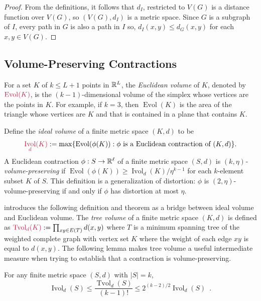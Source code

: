 \documentclass{patmorin}
\makeatletter
\renewcommand{\ge}{\geqslant}
\renewcommand{\le}{\leqslant}
\newcommand{\defin}[1]{\emph{\textcolor{brightmaroon}{#1}}}
\def\mathcolor#1#{\@mathcolor{#1}}
\def\@mathcolor#1#2#3{%
  \protect\leavevmode
  \begingroup
    \color#1{#2}#3%
  \endgroup
}
\newcommand{\mathdefin}[1]{\mathcolor{brightmaroon}{#1}}
\DeclareMathOperator{\evol}{Evol}
\DeclareMathOperator{\ivol}{Ivol}
\DeclareMathOperator{\tvol}{Tvol}
\makeatother
\begin{document}
\begin{proof}
  From the definitions, it follows that $d_I$, restricted to $V(G)$ is a distance function over $V(G)$, so $(V(G),d_I)$ is a metric space.  Since $G$ is a subgraph of $I$, every path in $G$ is also a path in $I$ so, $d_I(x,y)\le d_G(x,y)$ for each $x,y\in V(G)$.  
\end{proof}



\subsection{Volume-Preserving Contractions}
\label{contractions_section}

For a set $K$ of $k\le L+1$ points in $\mathbb{R}^L$, the \defin{Euclidean volume} of $K$, denoted by $\mathdefin{\evol(K)}$, is the $(k-1)$-dimensional volume of the simplex whose vertices are the points in $K$.  For example, if $k=3$, then $\evol(K)$ is the area of the triangle whose vertices are $K$ and that is contained in a plane that contains $K$.

Define the \defin{ideal volume} of a finite metric space $(K,d)$ to be 
$$\mathdefin{\ivol_d(K)}:=\max\{\evol(\phi(K)):\text{$\phi$ is a Euclidean contraction of $(K,d)$}\}.$$  
A Euclidean contraction $\phi:S\to\mathbb{R}^{\ell}$ of a finite metric space $(S,d)$ is \defin{$(k,\eta)$-volume-preserving} if $\evol(\phi(K))\ge \ivol_d(K)/\eta^{k-1}$ for each $k$-element subset $K$ of $S$.  This definition is a generalization of distortion: $\phi$ is $(2,\eta)$-volume-preserving if and only if $\phi$ has distortion at most $\eta$.

\citet{feige:approximating} introduces the following definition and theorem as a bridge between ideal volume and Euclidean volume. The \defin{tree volume} of a finite metric space $(K,d)$ is defined as $\mathdefin{\tvol_d(K)}:=\prod_{xy\in E(T)} d(x,y)$ where $T$ is a minimum spanning tree of the weighted complete graph with vertex set $K$ where the weight of each edge $xy$ is equal to $d(x,y)$.  The following lemma makes tree volume a useful intermediate measure when trying to establish that a contraction is volume-preserving.

\begin{lem}\label{tvol_vs_ivol}
For any finite metric space  $(S,d)$ with $|S|=k$, 
  \[
    \ivol_{d}(S) \le \frac{\tvol_d(S)}{(k-1)!} \le 2^{(k-2)/2}\ivol_d(S) \enspace .
  \]
\end{lem}
\end{document}
